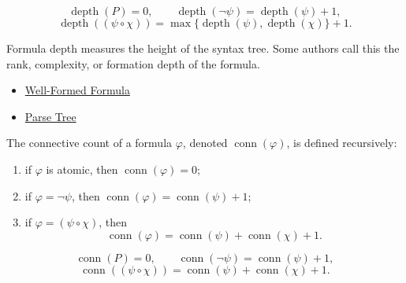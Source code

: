 \begin{remark*}
\[
\operatorname{depth}(P)=0,\qquad
\operatorname{depth}(\neg\psi)=\operatorname{depth}(\psi)+1,
\]
\[
\operatorname{depth}((\psi\circ\chi))
=
\max\{\operatorname{depth}(\psi),\operatorname{depth}(\chi)\}+1.
\]
\end{remark*}

\begin{remark*}[Interpretation]
Formula depth measures the height of the syntax tree. Some authors call this the rank, complexity, or formation depth of the formula.
\end{remark*}

\begin{dependencies}
\begin{itemize}
  \item \hyperref[def:well-formed-formula]{Well-Formed Formula}
  \item \hyperref[def:parse-tree-propositional-logic]{Parse Tree}
\end{itemize}
\end{dependencies}
\begin{tcolorbox}[colback=propbox, colframe=propborder, arc=2pt,
  left=6pt, right=6pt, top=4pt, bottom=4pt,
  title={\small\textbf{Definition (Connective Count)}},
  fonttitle=\small\bfseries]
\begin{definition}
\label{def:connective-count-propositional-logic}
The connective count of a formula \(\varphi\), denoted \(\operatorname{conn}(\varphi)\), is defined recursively:
\begin{enumerate}
\item if \(\varphi\) is atomic, then \(\operatorname{conn}(\varphi)=0\);
\item if \(\varphi=\neg\psi\), then \(\operatorname{conn}(\varphi)=\operatorname{conn}(\psi)+1\);
\item if \(\varphi=(\psi\circ\chi)\), then
\[
\operatorname{conn}(\varphi)=\operatorname{conn}(\psi)+\operatorname{conn}(\chi)+1.
\]
\end{enumerate}
\end{definition}
\end{tcolorbox}

\begin{remark*}
\[
\operatorname{conn}(P)=0,\qquad
\operatorname{conn}(\neg\psi)=\operatorname{conn}(\psi)+1,
\]
\[
\operatorname{conn}((\psi\circ\chi))
=
\operatorname{conn}(\psi)+\operatorname{conn}(\chi)+1.
\]
\end{remark*}

